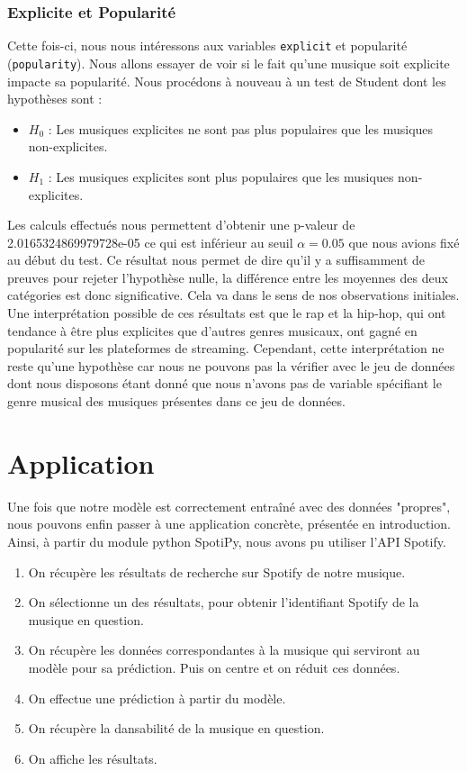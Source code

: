 \documentclass[a4paper, 12pt]{report}
\begin{document}
\subsection{Explicite et Popularité}

Cette fois-ci, nous nous intéressons aux variables \verb|explicit| et popularité (\verb|popularity|). Nous allons essayer de voir si le fait qu'une musique soit explicite impacte sa popularité. Nous procédons à nouveau à un test de Student dont les hypothèses sont :
\begin{itemize}
    \item \(H_0\) : Les musiques explicites ne sont pas plus populaires que les musiques non-explicites.
    \item \(H_1\) : Les musiques explicites sont plus populaires que les musiques non-explicites.
\end{itemize}
Les calculs effectués nous permettent d'obtenir une p-valeur de 2.0165324869979728e-05 ce qui est inférieur au seuil $\alpha = 0.05$ que nous avions fixé au début du test. Ce résultat nous permet de dire qu'il y a suffisamment de preuves pour rejeter l'hypothèse nulle, la différence entre les moyennes des deux catégories est donc significative. Cela va dans le sens de nos observations initiales. Une interprétation possible de ces résultats est que le rap et la hip-hop, qui ont tendance à être plus explicites que d'autres genres musicaux, ont gagné en popularité sur les plateformes de streaming. Cependant, cette interprétation ne reste qu'une hypothèse car nous ne pouvons pas la vérifier avec le jeu de données dont nous disposons étant donné que nous n'avons pas de variable spécifiant le genre musical des musiques présentes dans ce jeu de données.

\chapter{Application}

Une fois que notre modèle est correctement entraîné avec des données "propres", nous pouvons enfin passer à une application concrète, présentée en introduction. Ainsi, à partir du module python SpotiPy\cite{SpotiPy_Documentation}, nous avons pu utiliser l'API Spotify\cite{Spotify_for_Developers_API}.

\begin{enumerate}
    \item On récupère les résultats de recherche sur Spotify de notre musique.
    \item On sélectionne un des résultats, pour obtenir l'identifiant Spotify de la musique en question.
    \item On récupère les données correspondantes à la musique qui serviront au modèle pour sa prédiction. Puis on centre et on réduit ces données.
    \item On effectue une prédiction à partir du modèle.
    \item On récupère la dansabilité de la musique en question.
    \item On affiche les résultats.
\end{enumerate}
\end{document}
